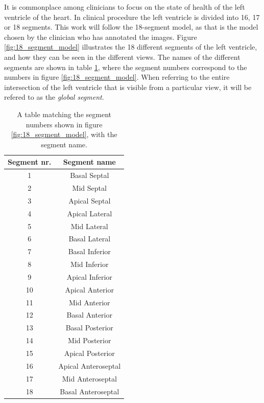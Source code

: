 It is commonplace among clinicians to focus on the state of health of the left ventricle of the heart. In clinical procedure the left ventricle is divided into 16, 17 or 18 segments. This work will follow the 18-segment model, as that is the model chosen by the clinician who has annotated the images. Figure \ref{fig:18_segment_model} illustrates the 18 different segments of the left ventricle, and how they can be seen in the different views. The names of the different segments are shown in table \ref{tab:segment_names}, where the segment numbers correspond to the numbers in figure \ref{fig:18_segment_model}. When referring to the entire intersection of the left ventricle that is visible from a particular view, it will be refered to as the \textit{global segment}.

\begin{table}
    \centering
    \begin{tabular}{cc}
        \toprule
        Segment nr. & Segment name \\
        \midrule
        1           & Basal Septal  \\
        2           & Mid Septal  \\
        3           & Apical Septal  \\
        4           & Apical Lateral  \\
        5           & Mid Lateral  \\
        6           & Basal Lateral  \\
        7           & Basal Inferior  \\
        8           & Mid Inferior  \\
        9           & Apical Inferior  \\
        10          & Apical Anterior  \\
        11          & Mid Anterior  \\
        12          & Basal Anterior  \\
        13          & Basal Posterior  \\
        14          & Mid Posterior  \\
        15          & Apical Posterior  \\
        16          & Apical Anteroseptal  \\
        17          & Mid Anteroseptal  \\
        18          & Basal Anteroseptal  \\
        \bottomrule
    \end{tabular}
    \caption{A table matching the segment numbers shown in figure \ref{fig:18_segment_model}, with the segment name.}
    \label{tab:segment_names}
\end{table}


